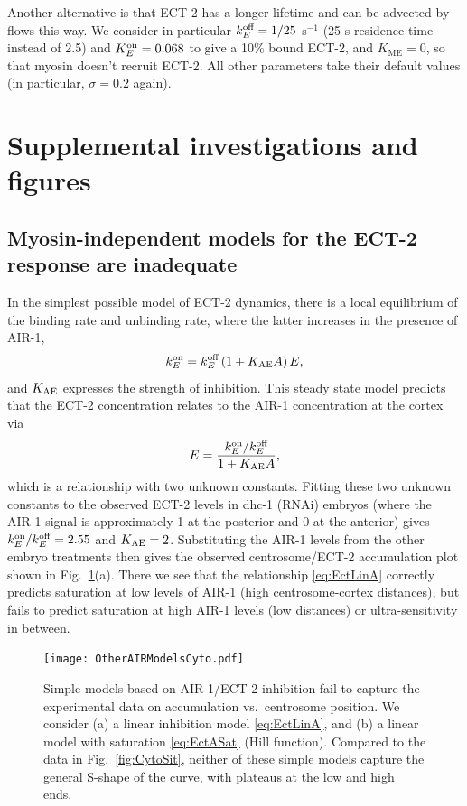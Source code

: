 \documentclass[11pt]{article}
\begin{document}
\begin{appendix}
Another alternative is that ECT-2 has a longer lifetime and can be advected by flows this way. We consider in particular $k^\text{off}_E=1/25$ s$^{-1}$ (25 s residence time instead of 2.5) and $K^\text{on}_E=0.068$ to give a 10\% bound ECT-2, and $K_\text{ME}=0$, so that myosin doesn't recruit ECT-2. All other parameters take their default values (in particular, $\sigma=0.2$ again). 

\section{Supplemental investigations and figures}

\subsection{Myosin-independent models for the ECT-2 response are inadequate \label{sec:MyIndModels}}
In the simplest possible model of ECT-2 dynamics, there is a local equilibrium of the binding rate and unbinding rate, where the latter increases in the presence of AIR-1,
\begin{equation}
\label{eq:EctA}
 k^\text{on}_E = k^\text{off}_E \left(1+K_\text{AE} A \right)E,
\end{equation}
and $K_\text{AE}$ expresses the strength of inhibition. This steady state model predicts that the ECT-2 concentration relates to the AIR-1 concentration at the cortex via
\begin{equation}
\label{eq:EctLinA}
E = \frac{k^\text{on}_E/ k^\text{off}_E}{ 1+K_\text{AE} A},
\end{equation}
which is a relationship with two unknown constants. Fitting these two unknown constants to the observed ECT-2 levels in dhc-1 (RNAi) embryos (where the AIR-1 signal is approximately 1 at the posterior and 0 at the anterior) gives $k^\text{on}_E/ k^\text{off}_E=2.55$ and $K_\text{AE}=2$. Substituting the AIR-1 levels from the other embryo treatments then gives the observed centrosome/ECT-2 accumulation plot shown in Fig.\ \ref{fig:LinFail}(a). There we see that the relationship \eqref{eq:EctLinA} correctly predicts saturation at low levels of AIR-1 (high centrosome-cortex distances), but fails to predict saturation at high AIR-1 levels (low distances) or ultra-sensitivity in between. 

\begin{figure}
\centering
\texttt{[image: OtherAIRModelsCyto.pdf]}
\caption{\label{fig:LinFail}Simple models based on AIR-1/ECT-2 inhibition fail to capture the experimental data on accumulation vs.\ centrosome position. We consider (a) a linear inhibition model \eqref{eq:EctLinA}, and (b) a linear model with saturation \eqref{eq:EctASat} (Hill function). Compared to the data in Fig.\ \ref{fig:CytoSit}, neither of these simple models capture the general S-shape of the curve, with plateaus at the low and high ends. }
\end{figure}


\end{appendix}
\end{document}
